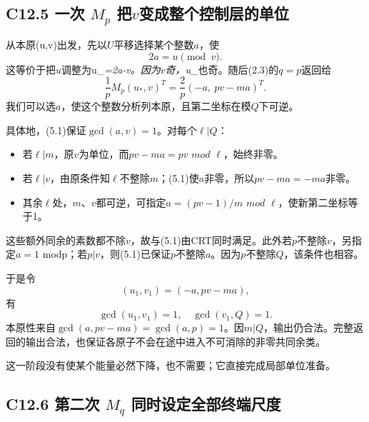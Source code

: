 \documentclass[11pt,a4paper]{article}
\newcommand{\tightlist}{\setlength{\itemsep}{0pt}\setlength{\parskip}{0pt}}
\theoremstyle{definition}
\numberwithin{equation}{section}
\begin{document}
\subsection*{\texorpdfstring{{C12.5} {一次} {\ensuremath{M_{p}}} {把\ensuremath{v}变成整个控制层的单位}}{C12.5 一次  把变成整个控制层的单位}}\label{C12-h87}

{从本原(u,v)出发，先以\ensuremath{U}平移选择某个整数\ensuremath{a}，使} \[
2a=u\pmod v.
\tag{C12.5.1}
\] {这等价于把\ensuremath{u}调整为u\_}\emph{{=2a-v。因为\ensuremath{v}奇，u\_}}{也奇。随后(2.3)的\ensuremath{q=p}返回给} \[
\frac1pM_p(u_*,v)^T
=\frac2p(-a,\ pv-ma)^T.
\tag{C12.5.2}
\] {我们可以选\ensuremath{a}，使这个整数分析列本原，且第二坐标在模\ensuremath{Q}下可逆。}

{具体地，(5.1)保证\ensuremath{\operatorname{gcd}(a,v)=1}。对每个\ensuremath{\ell |Q}：}

\begin{itemize}
\tightlist
\item
  {若\ensuremath{\ell |m}，原\ensuremath{v}为单位，而\ensuremath{pv-ma=pv}} {\ensuremath{mod}} {\ensuremath{\ell }，始终非零。}
\item
  {若\ensuremath{\ell |v}，由原条件知\ensuremath{\ell }不整除\ensuremath{m}；(5.1)使\ensuremath{a}非零，所以\ensuremath{pv-ma=-ma}非零。}
\item
  {其余\ensuremath{\ell }处，\ensuremath{m}、\ensuremath{v}都可逆，可指定\ensuremath{a=(pv-1)/m}} {\ensuremath{mod}} {\ensuremath{\ell }，使新第二坐标等于1。}
\end{itemize}

{这些额外同余的素数都不除\ensuremath{v}，故与(5.1)由CRT同时满足。此外若\ensuremath{p}不整除\ensuremath{v}，另指定\ensuremath{a=1}} {modp；若\ensuremath{p|v}，则(5.1)已保证\ensuremath{p}不整除\ensuremath{a}。因为\ensuremath{p}不整除\ensuremath{Q}，该条件也相容。}

{于是令} \[
(u_1,v_1)=(-a,pv-ma),
\] {有} \[
\boxed{\gcd(u_1,v_1)=1,\quad\gcd(v_1,Q)=1.}
\tag{C12.5.3}
\] {本原性来自\ensuremath{\operatorname{gcd}(a,pv-ma)=\operatorname{gcd}(a,p)=1}。因\ensuremath{m|Q}，输出仍合法。完整返回的输出合法，也保证各原子不会在途中进入不可消除的非零共同余类。}

{这一阶段没有使某个能量必然下降，也不需要；它直接完成局部单位准备。}

\subsection*{\texorpdfstring{{C12.6} {第二次} {\ensuremath{M_{q}}} {同时设定全部终端尺度}}{C12.6 第二次  同时设定全部终端尺度}}\label{C12-h88}
\end{document}
